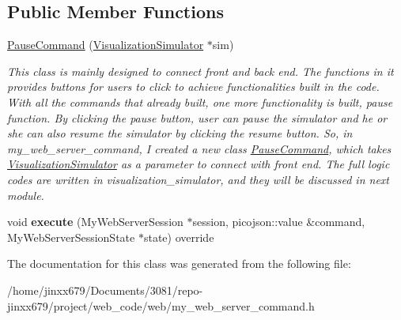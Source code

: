 \subsection*{Public Member Functions}
\begin{DoxyCompactItemize}
\item 
\mbox{\label{classPauseCommand_a09d664a2d3c592c15df73c7859949bfa}} 
\hyperlink{classPauseCommand_a09d664a2d3c592c15df73c7859949bfa}{Pause\+Command} (\hyperlink{classVisualizationSimulator}{Visualization\+Simulator} $\ast$sim)
\begin{DoxyCompactList}\small\item\em This class is mainly designed to connect front and back end. The functions in it provides buttons for users to click to achieve functionalities built in the code. With all the commands that already built, one more functionality is built, pause function. By clicking the pause button, user can pause the simulator and he or she can also resume the simulator by clicking the resume button. So, in my\+\_\+web\+\_\+server\+\_\+command, I created a new class \hyperlink{classPauseCommand}{Pause\+Command}, which takes \hyperlink{classVisualizationSimulator}{Visualization\+Simulator} as a parameter to connect with front end. The full logic codes are written in visualization\+\_\+simulator, and they will be discussed in next module. \end{DoxyCompactList}\item 
\mbox{\label{classPauseCommand_a5b19766b2599751b0e8ce6214f49f67c}} 
void {\bfseries execute} (My\+Web\+Server\+Session $\ast$session, picojson\+::value \&command, My\+Web\+Server\+Session\+State $\ast$state) override
\end{DoxyCompactItemize}


The documentation for this class was generated from the following file\+:\begin{DoxyCompactItemize}
\item 
/home/jinxx679/\+Documents/3081/repo-\/jinxx679/project/web\+\_\+code/web/my\+\_\+web\+\_\+server\+\_\+command.\+h\end{DoxyCompactItemize}
